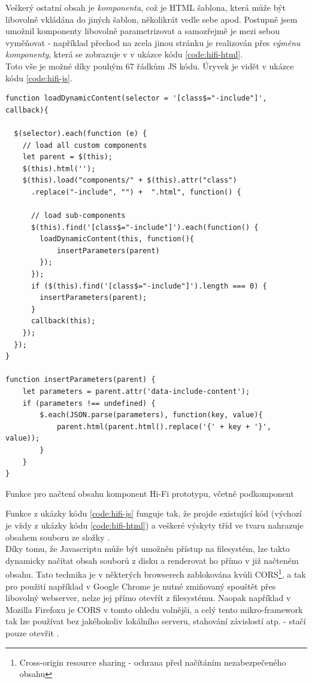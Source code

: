 Veškerý ostatní obsah je \emph{komponenta}, což je HTML šablona, která může být libovolně vkládána do jiných šablon, několikrát vedle sebe apod. Postupně jsem umožnil komponenty libovolně parametrizovat a samozřejmě je mezi sebou vyměňovat - například přechod na zcela jinou stránku je realizován přes \emph{výměnu komponenty}, která se zobrazuje v  v ukázce kódu \ref{code:hifi-html}.\\
Toto vše je možné díky pouhým 67 řádkům JS kódu. Úryvek je vidět v ukázce kódu \ref{code:hifi-js}.

\begin{listing}[H]
\begin{verbatim}
function loadDynamicContent(selector = '[class$="-include"]', callback){

  $(selector).each(function (e) {
    // load all custom components
    let parent = $(this);
    $(this).html('');
    $(this).load("components/" + $(this).attr("class")
      .replace("-include", "") +  ".html", function() {

      // load sub-components
      $(this).find('[class$="-include"]').each(function() {
        loadDynamicContent(this, function(){
            insertParameters(parent)
        });
      });
      if ($(this).find('[class$="-include"]').length === 0) {
        insertParameters(parent);
      }
      callback(this);
    });
  });
}

function insertParameters(parent) {
    let parameters = parent.attr('data-include-content');
    if (parameters !== undefined) {
        $.each(JSON.parse(parameters), function(key, value){
            parent.html(parent.html().replace('{' + key + '}', value));
        }
    }
}
\end{verbatim}
\caption[Funkce pro načtení obsahu komponent Hi-Fi prototypu]{Funkce pro načtení obsahu komponent Hi-Fi prototypu, včetně podkomponent} \label{code:hifi-js}
\end{listing}

Funkce  z ukázky kódu \ref{code:hifi-js} funguje tak, že projde existující kód (výchozí je vždy  z ukázky kódu \ref{code:hifi-html}) a veškeré výskyty tříd ve tvaru  nahrazuje obsahem souboru  ze složky .\\
Díky tomu, že Javascriptu může být umožněn přístup na filesystém, lze takto dynamicky načítat obsah souborů z disku a renderovat ho přímo v již načteném obsahu. Tato technika je v některých browserech zablokována kvůli CORS\footnote{Cross-origin resource sharing - ochrana před načítáním nezabezpečeného obsahu}, a tak pro použití například v Google Chrome je nutné zmiňovaný  spouštět přes libovolný webserver, nelze jej přímo otevřít z filesystému. Naopak například v Mozilla Firefoxu je CORS v tomto ohledu volnějši, a celý tento mikro-framework tak lze používat bez jakéhokoliv lokálního serveru, stahování závislostí atp. - stačí pouze otevřit .\\


